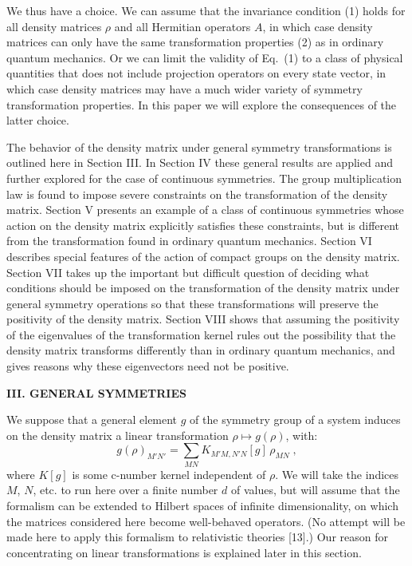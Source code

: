 \documentclass[12pt]{article}
\begin{document}
We thus have a choice.  We can assume that the invariance condition (1) holds for all density matrices $\rho$ and all Hermitian operators $A$, in which case density matrices can only have the same transformation properties (2) as in ordinary quantum mechanics.  Or we can limit the validity of Eq.~(1) to a class of physical quantities that does not include projection operators on every state vector, in which case density matrices may have a much wider variety of symmetry transformation properties.  In this paper we will explore the consequences of the latter choice.





The behavior  of the density matrix under general symmetry transformations is outlined here in Section III.  In Section IV these general results are applied and further explored for the case of continuous symmetries.  The group multiplication law is found to impose severe constraints on the transformation of the density matrix.  Section V presents an example of a class of  continuous symmetries whose action on the density matrix explicitly satisfies these constraints, but is different from the transformation found in ordinary quantum mechanics.  Section VI describes special features of the action of compact groups on the density matrix.  Section VII takes up the important but difficult question of deciding what conditions should be imposed on the transformation of the density matrix under general symmetry operations so that these transformations will preserve the positivity of the density matrix.  Section VIII shows that assuming the positivity of the eigenvalues of the transformation kernel rules out the possibility that the density matrix transforms differently than in ordinary quantum mechanics, and gives reasons why these eigenvectors need not be positive.

\vspace{20pt}

\begin{center}
{\bf III. GENERAL SYMMETRIES}
\end{center}


We suppose that a general element $g$ of the symmetry group of a system induces on the density matrix a linear transformation $\rho\mapsto g(\rho)$, with:
\begin{equation}
g(\rho)_{M'N'}=\sum_{MN}K_{M'M,N'N}[g]\,\rho_{MN}\;,
\end{equation}
where $K[g]$ is some c-number kernel independent of $\rho$.  
We will take the indices $M$, $N$, etc. to run here over a finite number $d$ of values, but will assume that the formalism can be extended to Hilbert spaces of infinite dimensionality, on which the matrices considered here become well-behaved operators.   (No attempt will be made here to apply this formalism to relativistic  theories [13].)  Our reason for concentrating on linear transformations is explained later in this section.
\end{document}
